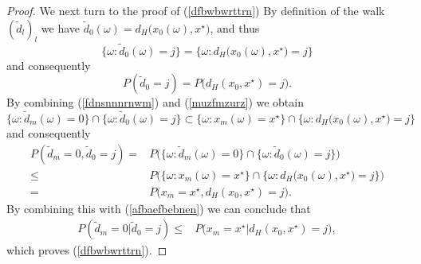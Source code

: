 \documentclass[a4paper,aps,floatfix]{revtex4}
\begin{document}
\begin{proof}
We next turn to the proof of (\ref{dfbwbwrttrn})
By definition of the walk $(\tilde{d}_l)_l$ we have $\tilde{d}_0(\omega) = d_H\big(x_0(\omega),x^{\star}\big)$, and thus 
\begin{equation}
\label{muzfmzurz}
\{\omega: \tilde{d}_0(\omega) = j\} = \{\omega: d_H\big(x_0(\omega),x^{\star}\big) = j\}
\end{equation}
and consequently
\begin{equation}
\label{afbaefbebnen}
P(\tilde{d}_0 = j) = P\big(d_H(x_0,x^{\star}) = j\big).
\end{equation}
By combining (\ref{fdnsnnnrnwm})  and (\ref{muzfmzurz}) we obtain
\begin{equation}
\{\omega: \tilde{d}_m(\omega) = 0\}\cap \{\omega: \tilde{d}_0(\omega) = j\} \subset \{\omega: x_m(\omega) = x^{\star}\}\cap\{\omega: d_H\big(x_0(\omega),x^{\star}\big) = j\}
\end{equation}
and consequently
\begin{equation}
\begin{split}
P(\tilde{d}_m = 0,\tilde{d}_0 = j) 
= & P\big(\{\omega: \tilde{d}_m(\omega) = 0\}\cap \{\omega: \tilde{d}_0(\omega) = j\}\big)\\
\leq & P\big( \{\omega: x_m(\omega) = x^{\star}\}\cap\{\omega: d_H\big(x_0(\omega),x^{\star}\big) = j\}\big)\\
= &  P\big(  x_m = x^{\star}, d_H(x_0,x^{\star}) = j\big).
\end{split}
\end{equation}
By combining this with (\ref{afbaefbebnen}) we can conclude that
\begin{equation}
\begin{split}
P(\tilde{d}_m = 0|\tilde{d}_0 = j) 
\leq
&  P\big(  x_m = x^{\star}|d_H(x_0,x^{\star}) = j\big),
\end{split}
\end{equation}
which proves (\ref{dfbwbwrttrn}).



\end{proof}
\end{document}
